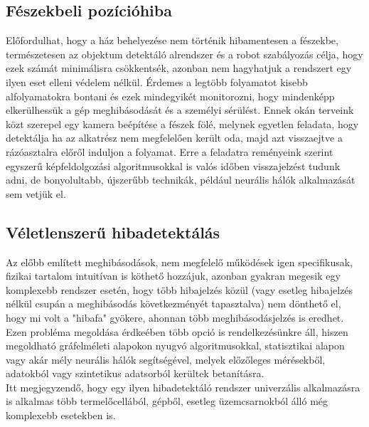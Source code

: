 \documentclass{article}
\begin{document}
\subsection{Fészekbeli pozícióhiba}
Előfordulhat, hogy a ház behelyezése nem történik hibamentesen a fészekbe, természetesen az objektum detektáló alrendszer és a robot szabályozás célja, hogy ezek számát minimálisra csökkentsék, azonban nem hagyhatjuk a rendszert egy ilyen eset elleni védelem nélkül.
Érdemes a legtöbb folyamatot kisebb alfolyamatokra bontani és ezek mindegyikét monitorozni, hogy mindenképp elkerülhessük a gép meghibásodását és a személyi sérülést. Ennek okán terveink közt szerepel egy kamera beépítése a fészek fölé, melynek egyetlen feladata, hogy detektálja ha az alkatrész nem megfelelően került oda, majd azt visszaejtve a rázóasztalra előről induljon a folyamat.
Erre a feladatra reményeink szerint egyszerű képfeldolgozási algoritmusokkal is valós időben visszajelzést tudunk adni, de bonyolultabb, újszerűbb technikák, például neurális hálók alkalmazását sem vetjük el.
\subsection{Véletlenszerű hibadetektálás}
Az előbb említett meghibásodások, nem megfelelő működések igen specifikusak, fizikai tartalom intuitívan is köthető hozzájuk, azonban gyakran megesik egy komplexebb rendszer esetén, hogy több hibajelzés közül (vagy esetleg hibajelzés nélkül csupán a meghibásodás következményét tapasztalva) nem dönthető el, hogy mi volt a "hibafa" gyökere, ahonnan több meghibásodásjelzés is eredhet.
Ezen probléma megoldása érdkeében több opció is rendelkezésünkre áll, hiszen megoldható gráfelméleti alapokon nyugvó algoritmusokkal, statisztikai alapon vagy akár mély neurális hálók segítségével, melyek előzőleges mérésekből, adatokból vagy szintetikus adatsorból kerültek betanításra.\\
Itt megjegyzendő, hogy egy ilyen hibadetektáló rendszer univerzális alkalmazásra is alkalmas több termelőcellából, gépből, esetleg üzemcsarnokból álló még komplexebb esetekben is.
\end{document}
